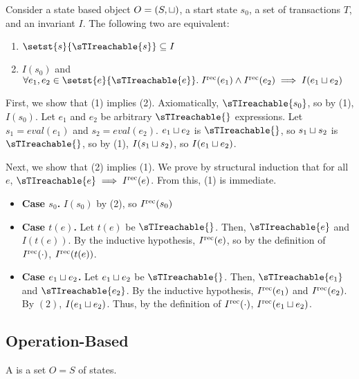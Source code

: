 \begin{claim}
  Consider a state based object $O = (S, \sqcup)$, a start state $s_0$, a set of
  transactions $T$, and an invariant $I$. The following two are equivalent:
  \begin{enumerate}[\quad(1)]
    \item
      $\setst{s}{\sTIreachable{s}} \subseteq I$

    \item
      $I(s_0)$ and
      $\forall e_1, e_2 \in \setst{e}{\sTIreachable{e}}.\;
         \Irec{e_1} \land \Irec{e_2} \implies I(e_1 \join e_2)$
  \end{enumerate}
\end{claim}
\begin{elidableproof}
  First, we show that (1) implies (2). Axiomatically, $\sTIreachable{s_0}$, so
  by (1), $I(s_0)$. Let $e_1$ and $e_2$ be arbitrary $\sTIreachable{}$
  expressions. Let $s_1 = eval(e_1)$ and $s_2 = eval(e_2)$. $e_1 \sqcup e_2$ is
  $\sTIreachable{}$, so $s_1 \sqcup s_2$ is $\sTIreachable{}$, so by (1), $I(s_1
  \sqcup s_2)$, so $I(e_1 \sqcup e_2)$.

  Next, we show that (2) implies (1). We prove by structural induction that for
  all $e$, $\sTIreachable{e} \implies \Irec{e}$. From this, (1) is immediate.
  \begin{itemize}
    \item \textbf{Case $s_0$.}
      $I(s_0)$ by (2), so $I^{\text{rec}}(s_0)$

    \item \textbf{Case $t(e)$.}
      Let $t(e)$ be $\sTIreachable{}$. Then, $\sTIreachable{e}$ and $I(t(e))$.
      By the inductive hypothesis, $I^{\text{rec}}(e)$, so by the definition of
      $I^{\text{rec}}(\cdot)$, $I^{\text{rec}}(t(e))$.

    \item \textbf{Case $e_1 \sqcup e_2$.}
      Let $e_1 \sqcup e_2$ be $\sTIreachable{}$. Then, $\sTIreachable{e_1}$ and
      $\sTIreachable{e_2}$.  By the inductive hypothesis, $I^{\text{rec}}(e_1)$ and
      $I^{\text{rec}}(e_2)$. By $(2)$, $I(e_1 \sqcup e_2)$. Thus, by the definition of
      $I^{\text{rec}}(\cdot)$, $I^{\text{rec}}(e_1 \sqcup e_2)$.
  \end{itemize}
\end{elidableproof}

\subsection{Operation-Based}
\begin{definition}
  A  is a set $O = S$ of states.
\end{definition}

